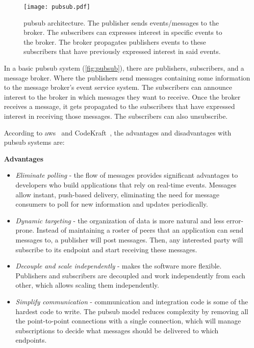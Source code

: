 \vspace{1.5cm}
\begin{figure}[ht]
    \centering
    \texttt{[image: pubsub.pdf]}
    \caption[Architecture - \acl{pubsub}]{\acl{pubsub} architecture. The publisher sends events/messages to the broker. The subscribers can expresses interest in specific events to the broker. The broker propagates publishers events to these subscribers that have previously expressed interest in said events.}
    \label{fig:pubsub}
\end{figure}
\vspace{1.5cm}

In a basic \ac{pubsub} system (\autoref{fig:pubsub}), there are publishers, subscribers, and a message broker. Where the publishers send messages containing some information to the message broker's event service system. The subscribers can announce interest to the broker in which messages they want to receive. Once the broker receives a message, it gets propagated to the subscribers that have expressed interest in receiving those messages. The subscribers can also unsubscribe.

\newpage
According to \ac{aws}~\cite{aws_benefit} and CodeKraft~\cite{pubsub_codekraft}, the advantages and disadvantages with \ac{pubsub} systems are:

\textbf{Advantages}
\begin{itemize}
    \item \emph{Eliminate polling} - the flow of messages provides significant advantages to developers who build applications that rely on real-time events. Messages allow instant, push-based delivery, eliminating the need for message consumers to poll for new information and updates periodically.
    
    \item \emph{Dynamic targeting} - the organization of data is more natural and less error-prone. Instead of maintaining a roster of peers that an application can send messages to, a publisher will post messages. Then, any interested party will subscribe to its endpoint and start receiving these messages.
    
    \item \emph{Decouple and scale independently} - makes the software more flexible. Publishers and subscribers are decoupled and work independently from each other, which allows scaling them independently.
    
    \item \emph{Simplify communication} - communication and integration code is some of the hardest code to write. The \ac{pubsub} model reduces complexity by removing all the point-to-point connections with a single connection, which will manage subscriptions to decide what messages should be delivered to which endpoints.
\end{itemize}

